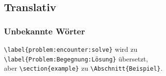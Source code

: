 
\subsection{Translativ}\label{problems:simple}
\subsubsection{Unbekannte Wörter}\label{problems:dim0}%
\verb|\label{problem:encounter:solve}| wird zu \verb|\label{Problem:Begegnung:Lösung}| übersetzt,\\aber \verb|\section{example}| zu \verb|\Abschnitt{Beispiel}|.

